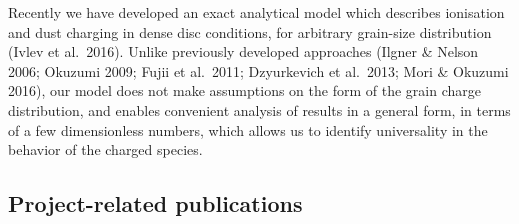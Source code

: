 \documentclass[10pt,fleqn,twoside]{article}
\begin{document}
Recently we have developed an exact analytical model which describes ionisation and dust charging in dense disc conditions,
for arbitrary grain-size distribution (Ivlev et al.\ 2016). Unlike previously developed approaches (Ilgner \& Nelson 2006; Okuzumi 2009; Fujii et al.\ 2011; Dzyurkevich et al.\ 2013; Mori \& Okuzumi 2016), our model does not make assumptions on the form of the grain charge distribution, and enables convenient analysis of results in a general form, in terms of a few dimensionless numbers, which allows us to identify universality in the behavior of the charged species.


\subsection{Project-related publications}
%
%

\end{document}
